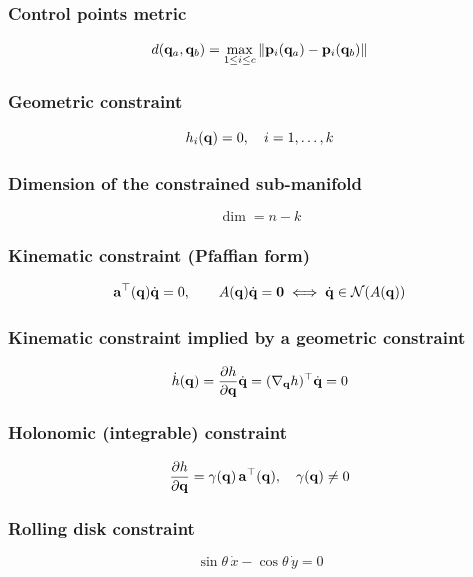 \subsubsection{Control points metric}
\begin{equation*}
    d({\mathbf q}_a,{\mathbf q}_b)=\max_{1\le i \le c}\|\mathbf p_i({\mathbf q}_a)-\mathbf p_i({\mathbf q}_b)\|
\end{equation*}

\subsubsection{Geometric constraint}
\begin{equation*}
    h_i({\mathbf q})=0,\quad i=1,\dots,k
\end{equation*}

\subsubsection{Dimension of the constrained sub-manifold}
\begin{equation*}
    \dim=n-k
\end{equation*}

\subsubsection{Kinematic constraint (Pfaffian form)}
\begin{equation*}
    \mathbf a^\top({\mathbf q}){\dot{\mathbf q}}=0,\qquad A({\mathbf q}){\dot{\mathbf q}}=\mathbf 0\iff {\dot{\mathbf q}}\in\mathcal N(A({\mathbf q}))
\end{equation*}

\subsubsection{Kinematic constraint implied by a geometric constraint}
\begin{equation*}
    \dot h({\mathbf q})=\frac{\partial h}{\partial {\mathbf q}}{\dot{\mathbf q}}=(\nabla_{\mathbf q} h)^\top{\dot{\mathbf q}}=0
\end{equation*}

\subsubsection{Holonomic (integrable) constraint}
\begin{equation*}
    \frac{\partial h}{\partial {\mathbf q}}=\gamma({\mathbf q})\,\mathbf a^\top({\mathbf q}),\quad \gamma({\mathbf q})\neq 0
\end{equation*}

\subsubsection{Rolling disk constraint}
\begin{equation*}
    \sin\theta\,\dot x-\cos\theta\,\dot y=0
\end{equation*}

